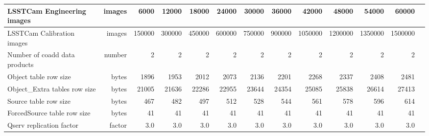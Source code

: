 \begin{longtable} { |p{}  |r  |r  |r  |r  |r  |r  |r  |r  |r  |r  |r  |r |}
{LSSTCam Engineering images}&{images}&{6000}&{12000}&{18000}&{24000}&{30000}&{36000}&{42000}&{48000}&{54000}&{60000} \\ \hline
{LSSTCam Calibration images}&{images}&{150000}&{300000}&{450000}&{600000}&{750000}&{900000}&{1050000}&{1200000}&{1350000}&{1500000} \\ \hline
{Number of coadd data products}&{number}&{2}&{2}&{2}&{2}&{2}&{2}&{2}&{2}&{2}&{2} \\ \hline
{Object table row size}&{bytes}&{1896}&{1953}&{2012}&{2073}&{2136}&{2201}&{2268}&{2337}&{2408}&{2481} \\ \hline
{Object\_Extra tables row size}&{bytes}&{21005}&{21636}&{22286}&{22955}&{23644}&{24354}&{25085}&{25838}&{26614}&{27413} \\ \hline
{Source table row size}&{bytes}&{467}&{482}&{497}&{512}&{528}&{544}&{561}&{578}&{596}&{614} \\ \hline
{ForcedSource table row size}&{bytes}&{41}&{41}&{41}&{41}&{41}&{41}&{41}&{41}&{41}&{41} \\ \hline
{Qserv replication factor}&{factor}&{3.0}&{3.0}&{3.0}&{3.0}&{3.0}&{3.0}&{3.0}&{3.0}&{3.0}&{3.0} \\ \hline
\end{longtable} \normalsize
